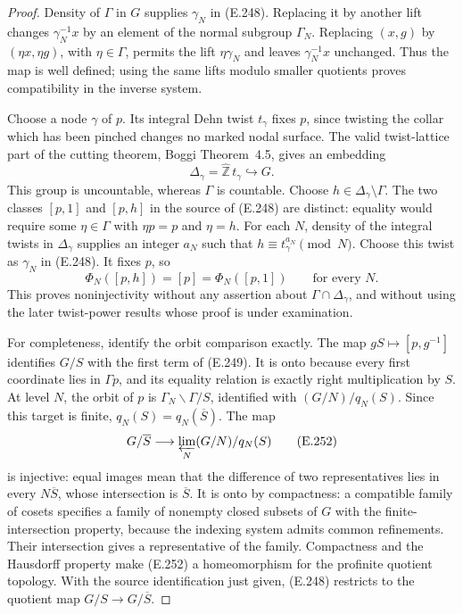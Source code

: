 \begin{proof}
Density of $\Gamma$ in $G$ supplies $\gamma_N$ in
(E.248).  Replacing it by another lift changes
$\gamma_N^{-1}x$ by an element of the normal subgroup
$\Gamma_N$.  Replacing $(x,g)$ by $(\eta x,\eta g)$,
with $\eta\in\Gamma$, permits the lift $\eta\gamma_N$
and leaves $\gamma_N^{-1}x$ unchanged.  Thus the map is
well defined; using the same lifts modulo smaller
quotients proves compatibility in the inverse system.

Choose a node $\gamma$ of $p$.  Its integral Dehn twist
$t_\gamma$ fixes $p$, since twisting the collar which
has been pinched changes no marked nodal surface.
The valid twist-lattice part of the cutting theorem,
Boggi Theorem~4.5, gives an embedding
\[
 \Delta_\gamma=\widehat{\mathbb Z}\,t_\gamma
                         \hookrightarrow G.               \tag{E.250}
\]
This group is uncountable, whereas $\Gamma$ is countable.
Choose $h\in\Delta_\gamma\setminus\Gamma$.
The two classes $[p,1]$ and $[p,h]$ in the source of
(E.248) are distinct: equality would require some
$\eta\in\Gamma$ with $\eta p=p$ and $\eta=h$.
For each $N$, density of the integral twists in
$\Delta_\gamma$ supplies an integer $a_N$ such that
$h\equiv t_\gamma^{a_N}\pmod N$.  Choose this twist
as $\gamma_N$ in (E.248).  It fixes $p$, so
\[
       \Phi_N([p,h])=[p]=\Phi_N([p,1])
                       \qquad\text{for every }N.          \tag{E.251}
\]
This proves noninjectivity without any assertion about
$\Gamma\cap\Delta_\gamma$, and without using the later
twist-power results whose proof is under examination.

For completeness, identify the orbit comparison exactly.
The map $gS\mapsto[p,g^{-1}]$ identifies $G/S$ with
the first term of (E.249).  It is onto because every
first coordinate lies in $\Gamma p$, and its equality
relation is exactly right multiplication by $S$.
At level $N$, the orbit of $p$ is
$\Gamma_N\backslash\Gamma/S$, identified with
$(G/N)/q_N(S)$.  Since this target is finite,
$q_N(S)=q_N(\overline S)$.  The map
\[
 G/\overline S\longrightarrow
          \varprojlim_N (G/N)/q_N(S)                       \tag{E.252}
\]
is injective: equal images mean that the difference
of two representatives lies in every $N\overline S$,
whose intersection is $\overline S$.  It is onto by
compactness: a compatible family of cosets specifies
a family of nonempty closed subsets of $G$ with the
finite-intersection property, because the indexing
system admits common refinements.  Their intersection
gives a representative of the family.  Compactness
and the Hausdorff property make (E.252) a homeomorphism
for the profinite quotient topology.  With the source
identification just given, (E.248) restricts to the
quotient map $G/S\to G/\overline S$.


\end{proof}
